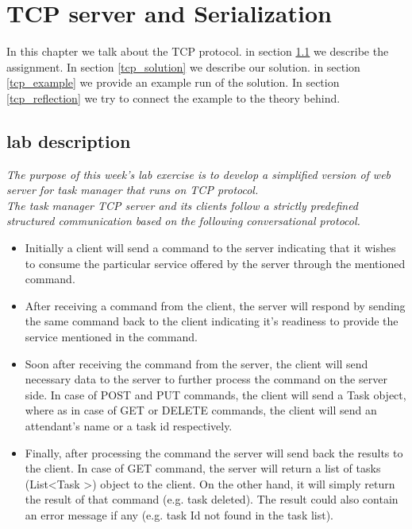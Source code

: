 \chapter{TCP server and Serialization}
\minitoc

In this chapter we talk about the TCP protocol. in section \ref{tcp_lab} we describe the assignment. In section \ref{tcp_solution} we describe our solution. in section \ref{tcp_example} we provide an example run of the solution. In section \ref{tcp_reflection} we try to connect the example to the theory behind. 

\section{lab description}
\label{tcp_lab}
\textit{The purpose of this week’s lab exercise is to develop a simplified version of web server for task manager that runs on TCP protocol.}\\

\textit{The task manager TCP server and its clients follow a strictly predefined structured communication based on the following conversational protocol.}

\begin{itemize}
\item Initially a client will send a command to the server indicating that it wishes to consume the particular service offered by the server through the mentioned command.\\

\item After receiving a command from the client, the server will respond by sending the same command back to the client indicating it’s readiness to provide the service mentioned in the command.\\

\item Soon after receiving the command from the server, the client will send necessary data to the server to further process the command on the server side. In case of POST and PUT commands, the client will send a Task object, where as in case of GET or DELETE commands, the client will send an attendant’s name or a task id respectively.\\

\item Finally, after processing the command the server will send back the results to the client. In case of GET command, the server will return a list of tasks (List\textless Task \textgreater) object to the client. On the other hand, it will simply return the result of that command (e.g. task deleted). The result could also contain an error message if any (e.g. task Id not found in the task list).
\end{itemize}


